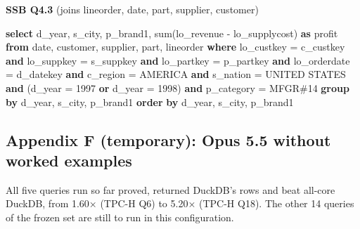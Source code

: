 \documentclass[
]{article}
\newenvironment{Shaded}{}{}
\newcommand{\DataTypeTok}[1]{\textcolor[rgb]{0.56,0.13,0.00}{#1}}
\newcommand{\DecValTok}[1]{\textcolor[rgb]{0.25,0.63,0.44}{#1}}
\newcommand{\FunctionTok}[1]{\textcolor[rgb]{0.02,0.16,0.49}{#1}}
\newcommand{\KeywordTok}[1]{\textcolor[rgb]{0.00,0.44,0.13}{\textbf{#1}}}
\newcommand{\NormalTok}[1]{#1}
\newcommand{\OperatorTok}[1]{\textcolor[rgb]{0.40,0.40,0.40}{#1}}
\newcommand{\StringTok}[1]{\textcolor[rgb]{0.25,0.44,0.63}{#1}}
\begin{document}
\textbf{SSB Q4.3} (joins lineorder, date, part, supplier, customer)

\begin{Shaded}
\begin{Highlighting}[]
\KeywordTok{select}\NormalTok{ d\_year, s\_city, p\_brand1, }\FunctionTok{sum}\NormalTok{(lo\_revenue }\OperatorTok{{-}}\NormalTok{ lo\_supplycost) }\KeywordTok{as}\NormalTok{ profit}
\KeywordTok{from} \DataTypeTok{date}\NormalTok{, customer, supplier, part, lineorder}
\KeywordTok{where}\NormalTok{ lo\_custkey }\OperatorTok{=}\NormalTok{ c\_custkey }\KeywordTok{and}\NormalTok{ lo\_suppkey }\OperatorTok{=}\NormalTok{ s\_suppkey }\KeywordTok{and}\NormalTok{ lo\_partkey }\OperatorTok{=}\NormalTok{ p\_partkey }\KeywordTok{and}\NormalTok{ lo\_orderdate }\OperatorTok{=}\NormalTok{ d\_datekey }\KeywordTok{and}\NormalTok{ c\_region }\OperatorTok{=} \StringTok{\textquotesingle{}AMERICA\textquotesingle{}} \KeywordTok{and}\NormalTok{ s\_nation }\OperatorTok{=} \StringTok{\textquotesingle{}UNITED STATES\textquotesingle{}} \KeywordTok{and}\NormalTok{ (d\_year }\OperatorTok{=} \DecValTok{1997} \KeywordTok{or}\NormalTok{ d\_year }\OperatorTok{=} \DecValTok{1998}\NormalTok{) }\KeywordTok{and}\NormalTok{ p\_category }\OperatorTok{=} \StringTok{\textquotesingle{}MFGR\#14\textquotesingle{}}
\KeywordTok{group} \KeywordTok{by}\NormalTok{ d\_year, s\_city, p\_brand1}
\KeywordTok{order} \KeywordTok{by}\NormalTok{ d\_year, s\_city, p\_brand1}
\end{Highlighting}
\end{Shaded}

\subsection{Appendix F (temporary): Opus 5.5 without worked
examples}\label{appendix-f-temporary-opus-5.5-without-worked-examples}

All five queries run so far proved, returned DuckDB's rows and beat
all-core DuckDB, from 1.60× (TPC-H Q6) to 5.20× (TPC-H Q18). The other
14 queries of the frozen set are still to run in this configuration.
\end{document}
